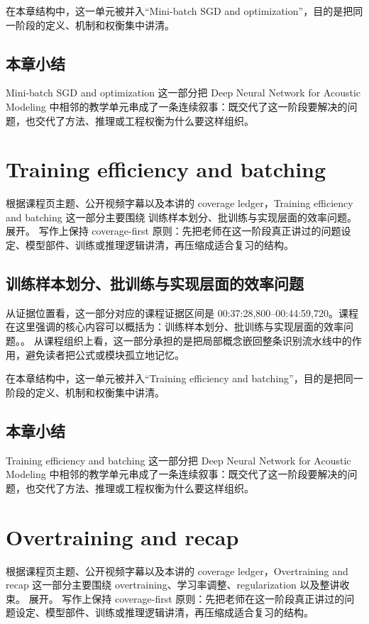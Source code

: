 \documentclass[a4paper]{article}
\begin{document}
在本章结构中，这一单元被并入“Mini-batch SGD and optimization”，目的是把同一阶段的定义、机制和权衡集中讲清。

\subsection{本章小结}
Mini-batch SGD and optimization 这一部分把 Deep Neural Network for Acoustic Modeling 中相邻的教学单元串成了一条连续叙事：既交代了这一阶段要解决的问题，也交代了方法、推理或工程权衡为什么要这样组织。

\section{Training efficiency and batching}
根据课程页主题、公开视频字幕以及本讲的 coverage ledger，Training efficiency and batching 这一部分主要围绕 训练样本划分、批训练与实现层面的效率问题。 展开。
写作上保持 coverage-first 原则：先把老师在这一阶段真正讲过的问题设定、模型部件、训练或推理逻辑讲清，再压缩成适合复习的结构。

\subsection{训练样本划分、批训练与实现层面的效率问题}
从证据位置看，这一部分对应的课程证据区间是 00:37:28,800--00:44:59,720。课程在这里强调的核心内容可以概括为：训练样本划分、批训练与实现层面的效率问题。。
从课程组织上看，这一部分承担的是把局部概念嵌回整条识别流水线中的作用，避免读者把公式或模块孤立地记忆。

在本章结构中，这一单元被并入“Training efficiency and batching”，目的是把同一阶段的定义、机制和权衡集中讲清。

\subsection{本章小结}
Training efficiency and batching 这一部分把 Deep Neural Network for Acoustic Modeling 中相邻的教学单元串成了一条连续叙事：既交代了这一阶段要解决的问题，也交代了方法、推理或工程权衡为什么要这样组织。

\section{Overtraining and recap}
根据课程页主题、公开视频字幕以及本讲的 coverage ledger，Overtraining and recap 这一部分主要围绕 overtraining、学习率调整、regularization 以及整讲收束。 展开。
写作上保持 coverage-first 原则：先把老师在这一阶段真正讲过的问题设定、模型部件、训练或推理逻辑讲清，再压缩成适合复习的结构。
\end{document}
